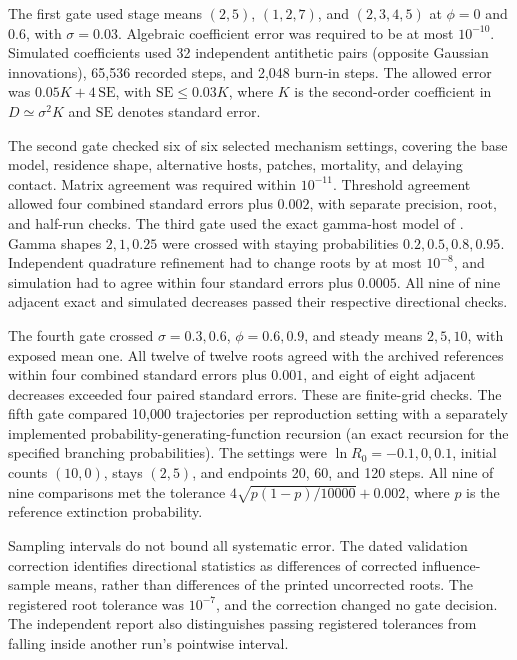 The first gate used stage means $(2,5)$, $(1,2,7)$, and $(2,3,4,5)$ at
$\phi=0$ and $0.6$, with $\sigma=0.03$. Algebraic coefficient error was
required to be at most $10^{-10}$. Simulated coefficients used 32 independent
antithetic pairs (opposite Gaussian innovations), 65,536 recorded steps,
and 2,048 burn-in steps. The allowed error was $0.05K+4\,\mathrm{SE}$,
with $\mathrm{SE}\leq0.03K$, where $K$ is the second-order coefficient in
$D\simeq\sigma^2K$ and $\mathrm{SE}$ denotes standard error.

The second gate checked six of six selected mechanism settings, covering
the base model, residence shape, alternative hosts, patches, mortality,
and delaying contact. Matrix agreement was required within $10^{-11}$.
Threshold agreement allowed four combined standard errors plus $0.002$,
with separate precision, root, and half-run checks. The third gate used
the exact gamma-host model of \citet{roerdink1988}. Gamma shapes
$2,1,0.25$ were crossed with staying probabilities $0.2,0.5,0.8,0.95$.
Independent quadrature refinement had to change roots by at most $10^{-8}$,
and simulation had to agree within four standard errors plus $0.0005$.
All nine of nine adjacent exact and simulated decreases passed their
respective directional checks.

The fourth gate crossed $\sigma=0.3,0.6$, $\phi=0.6,0.9$, and steady
means $2,5,10$, with exposed mean one. All twelve of twelve roots agreed
with the archived references within four combined standard errors plus
$0.001$, and eight of eight adjacent decreases exceeded four paired
standard errors. These are finite-grid checks. The fifth gate compared
10,000 trajectories per reproduction setting with a separately implemented
probability-generating-function recursion (an exact recursion for the
specified branching probabilities). The settings were $\ln R_0=-0.1,0,0.1$,
initial counts $(10,0)$, stays $(2,5)$, and endpoints 20, 60, and 120 steps.
All nine of nine comparisons met the tolerance
$4\sqrt{p(1-p)/10000}+0.002$, where $p$ is the reference extinction probability.

Sampling intervals do not bound all systematic error. The dated validation
correction identifies directional statistics as differences of corrected
influence-sample means, rather than differences of the printed uncorrected
roots. The registered root tolerance was $10^{-7}$, and the correction
changed no gate decision. The independent report also distinguishes passing
registered tolerances from falling inside another run's pointwise interval.

